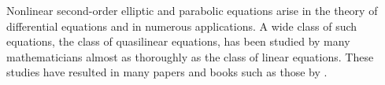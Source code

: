 \documentclass{article}
\begin{document}
Nonlinear second-order elliptic and parabolic equations arise in the theory of differential equations and in numerous applications. A wide class of such equations, the class of quasilinear equations, has been studied by many mathematicians almost as thoroughly as the class of linear equations. These studies have resulted in many papers and books such as those by \cite{ladyzhenskaya1973linear,ladyzhenskaya1967linear,ivanov1982quasi,GilbargTrudinger200101}.


%

%
%
\nocite{*}

\end{document}
